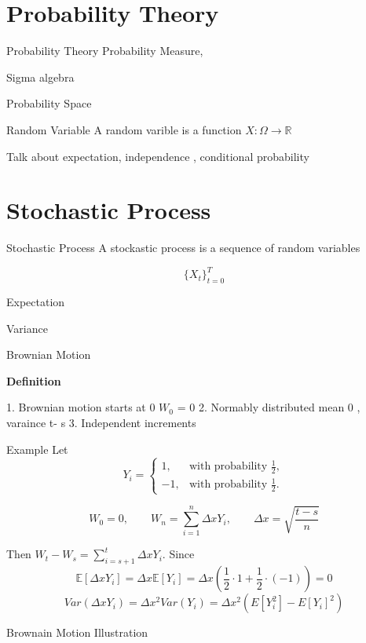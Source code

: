 \documentclass{beamer}
\begin{document}
\section{Probability Theory}
\begin{frame}{Probability Theory}
  Probability Measure,

  Sigma algebra

  Probability Space 

  


\end{frame}

\begin{frame}{Random Variable}
 A random varible is a function $X: \Omega \to \mathbb{R}$

 Talk about expectation, independence , conditional probability

\end{frame}




\section{Stochastic Process}
\begin{frame}{Stochastic Process}
  A stockastic process is a sequence of random variables 

  \[
    \{X_t\}_{t=0}^T
  \]

  Expectation


  Variance


\end{frame}


\begin{frame}{Brownian Motion}
  
  \textbf{Definition}

  1. Brownian motion starts at 0 
  $W_0$ = 0
  2. Normably distributed mean 0 , varaince  t- s
  3. Independent increments 
\end{frame}

\begin{frame}{Example}
  Let
  \[
  Y_i =
  \begin{cases}
  1, & \text{with probability } \frac12,\\
  -1, & \text{with probability } \frac12.
  \end{cases}
  \]

  \[
    W_0=0,\qquad W_n=\sum_{i=1}^{n}\Delta x Y_i,\qquad \Delta x = \sqrt{\frac{t-s}{n}}
  \]
  
  Then $W_t - W_s = \sum_{i=s+1}^{t} \Delta x Y_i$.
  Since
  \[
    \mathbb{E}[\Delta x Y_i]  = \Delta x \mathbb{E}[Y_i] = \Delta x (\frac{1}{2} \cdot 1 + \frac{1}{2} \cdot (-1)) = 0 
  \]
  \[
    Var(\Delta x Y_i) = \Delta x^2 Var(Y_i) = \Delta x^2 (E[Y_i^2] - E[Y_i]^2)
  \]
\end{frame} 

\begin{frame}{Brownain Motion Illustration}
\end{frame}
\end{document}
